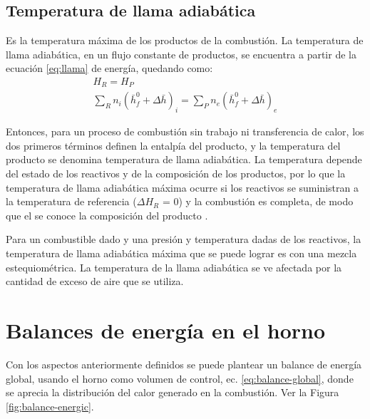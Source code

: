 \subsection{Temperatura de llama adiabática}
\par Es la temperatura máxima de los productos de la combustión. La temperatura de llama adiabática, en un flujo constante de productos, se encuentra a partir de la ecuación \ref{eq:llama} de energía, quedando como:
\begin{equation} \label{eq:llama}
\begin{gathered}
    H_R = H_P \\
    \sum_R n_i (\bar h^0_{f} + \Delta \bar h)_{i} = \sum_P n_e (\bar h^0_{f} + \Delta \bar h)_{e}
\end{gathered}
\end{equation}
\par Entonces, para un proceso de combustión sin trabajo ni transferencia de calor, los dos primeros términos definen la entalpía del producto, y la temperatura del producto se denomina temperatura de llama adiabática. La temperatura depende del estado de los reactivos y de la composición de los productos, por lo que la temperatura de llama adiabática máxima ocurre si los reactivos se suministran a la temperatura de referencia ($\Delta H_R$ = 0) y la combustión es completa, de modo que el se conoce la composición del producto \cite{bib:vanwylen}.
\par Para un combustible dado y una presión y temperatura dadas de los reactivos, la temperatura de llama adiabática máxima que se puede lograr es con una mezcla estequiométrica. La temperatura de la llama adiabática se ve afectada por la cantidad de exceso de aire que se utiliza.

\section{Balances de energía en el horno}
\par Con los aspectos anteriormente definidos se puede plantear un balance de energía global, usando el horno como volumen de control, ec. \ref{eq:balance-global}, donde se aprecia la distribución del calor generado en la combustión. Ver la Figura \ref{fig:balance-energic}.

